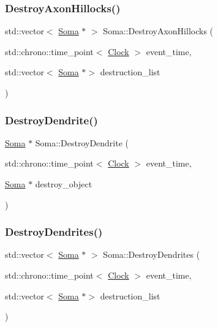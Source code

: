 \mbox{\label{classSoma_a5220929442601962af1a1fad66a8c919}} 
\subsubsection{\texorpdfstring{Destroy\+Axon\+Hillocks()}{DestroyAxonHillocks()}}
{\footnotesize\ttfamily std\+::vector$<$ \mbox{\hyperlink{classSoma}{Soma}} $\ast$ $>$ Soma\+::\+Destroy\+Axon\+Hillocks (\begin{DoxyParamCaption}\item[{std\+::chrono\+::time\+\_\+point$<$ \mbox{\hyperlink{universe_8h_a0ef8d951d1ca5ab3cfaf7ab4c7a6fd80}{Clock}} $>$}]{event\+\_\+time,  }\item[{std\+::vector$<$ \mbox{\hyperlink{classSoma}{Soma}} $\ast$$>$}]{destruction\+\_\+list }\end{DoxyParamCaption})}

\mbox{\label{classSoma_a086cb5a05e82f6f58ac0bd8403e25e07}} 
\subsubsection{\texorpdfstring{Destroy\+Dendrite()}{DestroyDendrite()}}
{\footnotesize\ttfamily \mbox{\hyperlink{classSoma}{Soma}} $\ast$ Soma\+::\+Destroy\+Dendrite (\begin{DoxyParamCaption}\item[{std\+::chrono\+::time\+\_\+point$<$ \mbox{\hyperlink{universe_8h_a0ef8d951d1ca5ab3cfaf7ab4c7a6fd80}{Clock}} $>$}]{event\+\_\+time,  }\item[{\mbox{\hyperlink{classSoma}{Soma}} $\ast$}]{destroy\+\_\+object }\end{DoxyParamCaption})}

\mbox{\label{classSoma_ac549a7caf885fdc0ac3a6adf393430af}} 
\subsubsection{\texorpdfstring{Destroy\+Dendrites()}{DestroyDendrites()}}
{\footnotesize\ttfamily std\+::vector$<$ \mbox{\hyperlink{classSoma}{Soma}} $\ast$ $>$ Soma\+::\+Destroy\+Dendrites (\begin{DoxyParamCaption}\item[{std\+::chrono\+::time\+\_\+point$<$ \mbox{\hyperlink{universe_8h_a0ef8d951d1ca5ab3cfaf7ab4c7a6fd80}{Clock}} $>$}]{event\+\_\+time,  }\item[{std\+::vector$<$ \mbox{\hyperlink{classSoma}{Soma}} $\ast$$>$}]{destruction\+\_\+list }\end{DoxyParamCaption})}

